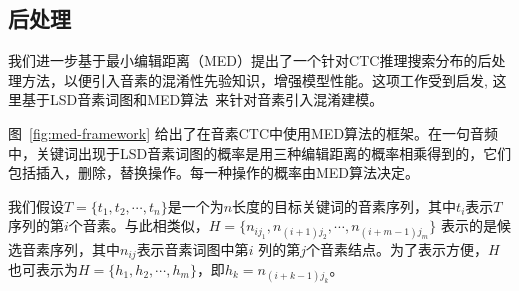 \subsection{后处理}
\label{Sec:post-process-ctc}

我们进一步基于最小编辑距离（MED）提出了一个针对CTC推理搜索分布的后处理方法，以便引入音素的混淆性先验知识，增强模型性能。这项工作受到\cite{chaudhari2007improvements}启发, 这里基于LSD音素词图和MED算法~\cite{7736093}来针对音素引入混淆建模。 

图~\ref{fig:med-framework} 给出了在音素CTC中使用MED算法的框架。在一句音频中，关键词出现于LSD音素词图的概率是用三种编辑距离的概率相乘得到的，它们包括插入，删除，替换操作。每一种操作的概率由MED算法决定。


我们假设$T=\{t_{1}, t_{2},\cdots,t_{n}\}$是一个为$n$长度的目标关键词的音素序列，其中$t_{i}$表示$T$序列的第$i$个音素。与此相类似，$H=\{n_{ij_{1}},n_{(i+1)j_{2}},\cdots,n_{(i+m-1)j_{m}}\}$ 表示的是候选音素序列，其中$n_{ij}$表示音素词图中第$i$ 列的第$j$个音素结点。为了表示方便，$H$也可表示为$H=\{h_{1},h_{2},\cdots,h_{m}\}$，即$h_{k}=n_{(i+k-1)j_{k}}$。

